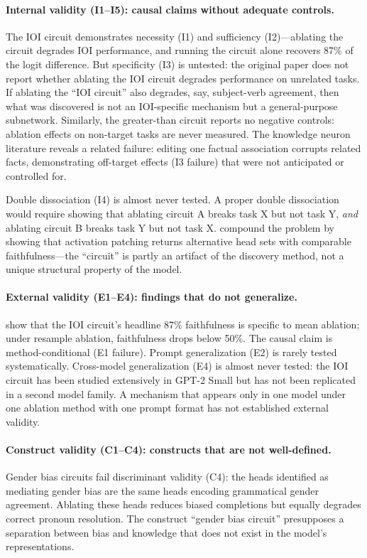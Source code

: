 \documentclass{article}
\begin{document}
\paragraph{Internal validity (I1--I5): causal claims without adequate controls.}
The IOI circuit demonstrates necessity (I1) and sufficiency (I2)---ablating the circuit degrades IOI performance, and running the circuit alone recovers 87\% of the logit difference. But specificity (I3) is untested: the original paper does not report whether ablating the IOI circuit degrades performance on unrelated tasks. If ablating the ``IOI circuit'' also degrades, say, subject-verb agreement, then what was discovered is not an IOI-specific mechanism but a general-purpose subnetwork. Similarly, the greater-than circuit \citep{hanna2023greater} reports no negative controls: ablation effects on non-target tasks are never measured. The knowledge neuron literature \citep{dai2022knowledge} reveals a related failure: editing one factual association corrupts related facts, demonstrating off-target effects (I3 failure) that were not anticipated or controlled for.

Double dissociation (I4) is almost never tested. A proper double dissociation would require showing that ablating circuit A breaks task X but not task Y, \emph{and} ablating circuit B breaks task Y but not task X. \citet{meloux2025everything} compound the problem by showing that activation patching returns alternative head sets with comparable faithfulness---the ``circuit'' is partly an artifact of the discovery method, not a unique structural property of the model.

\paragraph{External validity (E1--E4): findings that do not generalize.}
\citet{miller2024transformer} show that the IOI circuit's headline 87\% faithfulness is specific to mean ablation; under resample ablation, faithfulness drops below 50\%. The causal claim is method-conditional (E1 failure). Prompt generalization (E2) is rarely tested systematically. Cross-model generalization (E4) is almost never tested: the IOI circuit has been studied extensively in GPT-2 Small but has not been replicated in a second model family. A mechanism that appears only in one model under one ablation method with one prompt format has not established external validity.

\paragraph{Construct validity (C1--C4): constructs that are not well-defined.}
Gender bias circuits \citep{vig2020gender} fail discriminant validity (C4): the heads identified as mediating gender bias are the same heads encoding grammatical gender agreement. Ablating these heads reduces biased completions but equally degrades correct pronoun resolution. The construct ``gender bias circuit'' presupposes a separation between bias and knowledge that does not exist in the model's representations.
\end{document}
